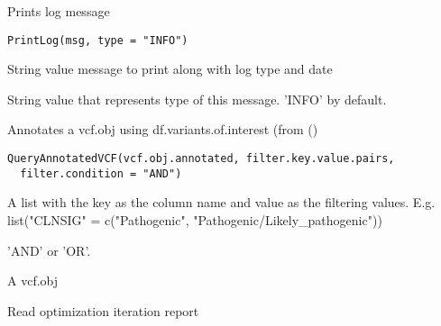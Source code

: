 \documentclass[letterpaper]{book}
\begin{document}
%
\begin{Description}\relax
Prints log message
\end{Description}
%
\begin{Usage}
\begin{verbatim}
PrintLog(msg, type = "INFO")
\end{verbatim}
\end{Usage}
%
\begin{Arguments}
\begin{ldescription}
\item[\code{msg}] String value message to print along with log type and date

\item[\code{type}] String value that represents type of this message. 'INFO' by default.
\end{ldescription}
\end{Arguments}
%
\begin{Description}\relax
Annotates a vcf.obj using df.variants.of.interest (from ()
\end{Description}
%
\begin{Usage}
\begin{verbatim}
QueryAnnotatedVCF(vcf.obj.annotated, filter.key.value.pairs,
  filter.condition = "AND")
\end{verbatim}
\end{Usage}
%
\begin{Arguments}
\begin{ldescription}
\item[\code{vcf.obj.annotated}] 

\item[\code{filter.key.value.pairs}] A list with the key as the column name and value as the
filtering values. E.g. list("CLNSIG" = c("Pathogenic", "Pathogenic/Likely\_pathogenic"))

\item[\code{filter.condition}] 'AND' or 'OR'.
\end{ldescription}
\end{Arguments}
%
\begin{Value}
A vcf.obj
\end{Value}
%
\begin{Description}\relax
Read optimization iteration report
\end{Description}
\end{document}
